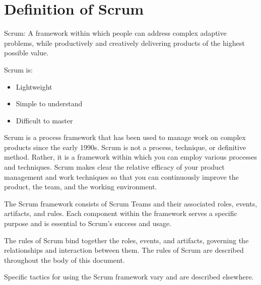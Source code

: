 \section{Definition of Scrum}
\begin{definition}{Scrum:}
A framework within which people can address complex adaptive problems, while
productively and creatively delivering products of the highest possible value.
\end{definition}
Scrum is:
\begin{itemize}
\item Lightweight
\item Simple to understand
\item Difficult to master
\end{itemize}
Scrum is a process framework that has been used to manage work on complex products since
the early 1990s. Scrum is not a process, technique, or definitive method. Rather, it is a
framework within which you can employ various processes and techniques. Scrum makes clear
the relative efficacy of your product management and work techniques so that you can
continuously improve the product, the team, and the working environment.

The Scrum framework consists of Scrum Teams and their associated roles, events, artifacts, and
rules. Each component within the framework serves a specific purpose and is essential to
Scrum's success and usage.

The rules of Scrum bind together the roles, events, and artifacts, governing the relationships and
interaction between them. The rules of Scrum are described throughout the body of this
document.

Specific tactics for using the Scrum framework vary and are described elsewhere.

